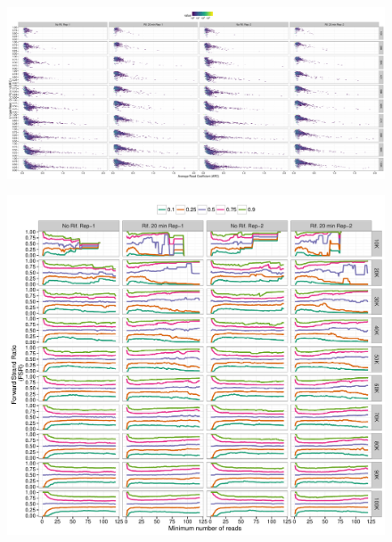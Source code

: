 \documentclass{article}
\begin{document}
\begin{figure}[H]
  \centering
  \includegraphics[width =.95\textheight,angle = 90,page =
1]{figures/supplement/QC_samp/Sig70_sample_bios2_enrichment.pdf} 
\end{figure}

\begin{figure}[H]
  \centering
  \includegraphics[width =.9\textheight,angle = 90,page =
1]{figures/supplement/QC_samp/Sig70_sample_bios2_strand_imbalance.pdf} 
\end{figure}
\end{document}
